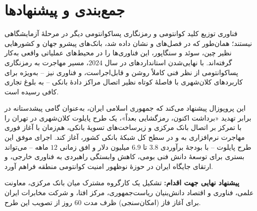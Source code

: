 \chapter{جمع‌بندی و پیشنهادها}
\label{chap:conclusions}

فناوری توزیع کلید کوانتومی و رمزنگاری پساکوانتومی دیگر در مرحلهٔ آزمایشگاهی نیستند؛ همان‌طور که در فصل‌های  و  نشان داده شد، بانک‌های پیشرو جهان و کشورهایی نظیر چین، سوئد و سنگاپور، این فناوری‌ها را در محیط‌های عملیاتی واقعی به‌کار گرفته‌اند. با نهایی‌شدن استانداردهای  در سال $2024$، مسیر مهاجرت به رمزنگاری پساکوانتومی از نظر فنی کاملاً روشن و قابل‌اجراست، و فناوری  نیز -- به‌ویژه برای کاربردهای کلان‌شهری با فاصلهٔ کوتاه نظیر اتصال مراکز دادهٔ بانکی -- به بلوغ تجاری کافی رسیده است.

این پروپوزال پیشنهاد می‌کند که جمهوری اسلامی ایران، به‌عنوان گامی پیشدستانه در برابر تهدید «برداشت اکنون، رمزگشایی بعداً»، یک طرح پایلوت کلان‌شهری در تهران را با تمرکز بر اتصال بانک مرکزی و زیرساخت‌های تسویهٔ بانکی، هم‌زمان با آغاز فوری مهاجرت نرم‌افزاری به  و  در سطح کل شبکهٔ بانکی کشور، آغاز کند. اجرای موفق این طرح پایلوت -- با بودجهٔ برآوردی $3.8$ تا $6.9$ میلیون دلار و افق زمانی $12$ ماهه -- می‌تواند بستری برای توسعهٔ دانش فنی بومی، کاهش وابستگی راهبردی به فناوری خارجی، و ارتقای جایگاه ایران در حوزهٔ نوظهور امنیت کوانتومی منطقه فراهم آورد.

\textbf{پیشنهاد نهایی جهت اقدام:} تشکیل یک کارگروه مشترک میان بانک مرکزی، معاونت علمی، فناوری و اقتصاد دانش‌بنیان ریاست‌جمهوری، مرکز افتا، و شرکت مخابرات ایران برای آغاز فاز  (امکان‌سنجی) ظرف مدت $60$ روز از تصویب این طرح.

